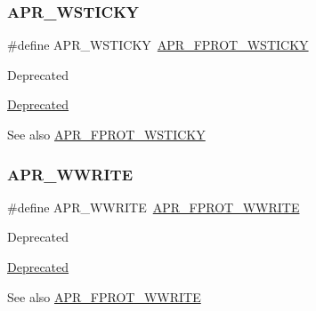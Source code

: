 \subsubsection{\texorpdfstring{A\+P\+R\+\_\+\+W\+S\+T\+I\+C\+KY}{APR\_WSTICKY}}
{\footnotesize\ttfamily \#define A\+P\+R\+\_\+\+W\+S\+T\+I\+C\+KY~\mbox{\hyperlink{group__apr__file__permissions_ga989dbea02f779a5f20a643d7e4ee9952}{A\+P\+R\+\_\+\+F\+P\+R\+O\+T\+\_\+\+W\+S\+T\+I\+C\+KY}}}

\begin{DoxyRefDesc}{Deprecated}
\item[\mbox{\hyperlink{deprecated__deprecated000011}{Deprecated}}]\end{DoxyRefDesc}
\begin{DoxySeeAlso}{See also}
\mbox{\hyperlink{group__apr__file__permissions_ga989dbea02f779a5f20a643d7e4ee9952}{A\+P\+R\+\_\+\+F\+P\+R\+O\+T\+\_\+\+W\+S\+T\+I\+C\+KY}} 
\end{DoxySeeAlso}
\mbox{\label{group__apr__file__permissions_ga7aac61689e9aaa93176bdb4911f56863}} 
\subsubsection{\texorpdfstring{A\+P\+R\+\_\+\+W\+W\+R\+I\+TE}{APR\_WWRITE}}
{\footnotesize\ttfamily \#define A\+P\+R\+\_\+\+W\+W\+R\+I\+TE~\mbox{\hyperlink{group__apr__file__permissions_ga51692a9828f5b6288d89495378944260}{A\+P\+R\+\_\+\+F\+P\+R\+O\+T\+\_\+\+W\+W\+R\+I\+TE}}}

\begin{DoxyRefDesc}{Deprecated}
\item[\mbox{\hyperlink{deprecated__deprecated000013}{Deprecated}}]\end{DoxyRefDesc}
\begin{DoxySeeAlso}{See also}
\mbox{\hyperlink{group__apr__file__permissions_ga51692a9828f5b6288d89495378944260}{A\+P\+R\+\_\+\+F\+P\+R\+O\+T\+\_\+\+W\+W\+R\+I\+TE}} 
\end{DoxySeeAlso}
